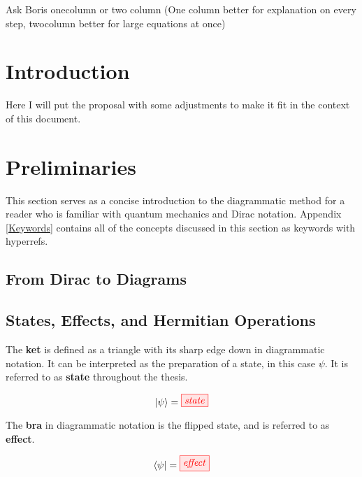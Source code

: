 \documentclass[]{article}
\title{}
\author{}
\begin{document}
\maketitle

\begin{abstract}

\end{abstract}

Ask Boris onecolumn or two column (One column better for explanation on every step, twocolumn better for large equations at once)

\section{Introduction}

Here I will put the proposal with some adjustments to make it fit in the context of this document.

\section{Preliminaries}

This section serves as a concise introduction to the diagrammatic method for a reader who is familiar with quantum mechanics and Dirac notation. Appendix \ref{Keywords} contains all of the concepts discussed in this section as keywords with hyperrefs.

\subsection{From Dirac to Diagrams}

\subsection{States, Effects, and Hermitian Operations}

\label{braandket}
The \textbf{ket} is defined as a triangle with its sharp edge down in diagrammatic notation. It can be interpreted as the preparation of a state, in this case $\psi$. It is referred to as \textbf{state} throughout the thesis.

\begin{equation}
\ket{\psi} =  \tikzfig{state}
\end{equation}

The \textbf{bra} in diagrammatic notation is the flipped state, and is referred to as \textbf{effect}. 

\begin{equation}
\bra{\psi} =  \tikzfig{effect}
\end{equation}
\end{document}
